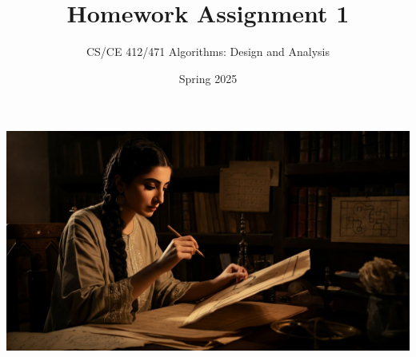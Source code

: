 \documentclass[a4paper]{exam}
\title{Homework Assignment 1}
\author{CS/CE 412/471 Algorithms: Design and Analysis}
\date{Spring 2025}
\begin{document}
\maketitle
\thispagestyle{empty}

\includegraphics[trim=0 5cm 0 1cm, clip, width=\textwidth]{title}
\end{document}
